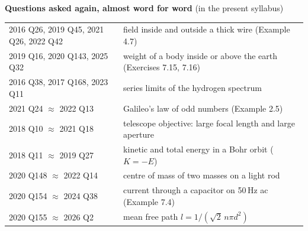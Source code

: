 {\small\textbf{\color{crimson}Questions asked again, almost word for word} (in the present syllabus)\par\smallskip
\begin{tabularx}{\linewidth}{@{}l>{\raggedright\arraybackslash}X@{}}
2016 Q26, 2019 Q45, 2021 Q26, 2022 Q42 & field inside and outside a thick wire (Example 4.7)\\
2019 Q16, 2020 Q143, 2025 Q32 & weight of a body inside or above the earth (Exercises 7.15, 7.16)\\
2016 Q38, 2017 Q168, 2023 Q11 & series limits of the hydrogen spectrum\\
2021 Q24 $\approx$ 2022 Q13 & Galileo's law of odd numbers (Example 2.5)\\
2018 Q10 $\approx$ 2021 Q18 & telescope objective: large focal length and large aperture\\
2018 Q11 $\approx$ 2019 Q27 & kinetic and total energy in a Bohr orbit ($K=-E$)\\
2020 Q148 $\approx$ 2022 Q14 & centre of mass of two masses on a light rod\\
2020 Q154 $\approx$ 2024 Q38 & current through a capacitor on 50\,Hz ac (Example 7.4)\\
2020 Q155 $\approx$ 2026 Q2 & mean free path $l=1/(\sqrt2\,n\pi d^2)$\\
\end{tabularx}}\par


